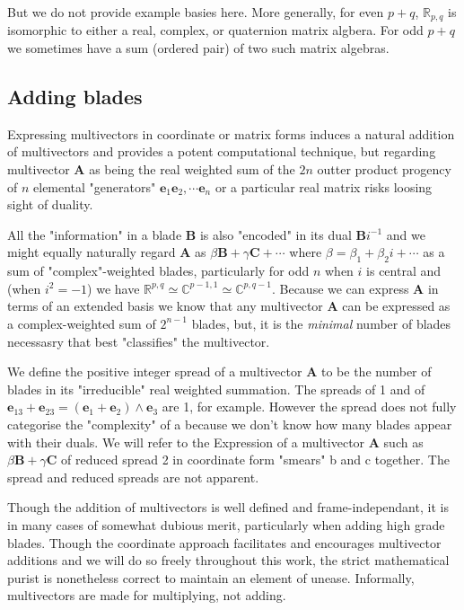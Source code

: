 \documentclass[a4paper]{book}
\numberwithin{equation}{chapter}
\begin{document}
 But we do not provide example basies here. More generally, for even $p+q$, $\mathbb{R}_{p,q}$ 
 is isomorphic to either a real, complex, or quaternion matrix algbera. For odd $p+q$ 
 we sometimes have a sum (ordered pair) of two such matrix algebras. 

    \subsection{Adding blades}

Expressing multivectors in coordinate or matrix forms induces a natural addition of multivectors and provides a 
potent computational technique, but regarding multivector $\mathbf{A}$ as being the real weighted sum of the $2n$
outter product progency of $n$ elemental "generators"  $\mathbf{e}_1\mathbf{e}_2, \cdots \mathbf{e}_n$ 
or a particular real matrix risks loosing sight of duality. 

All the "information" in a blade $\mathbf{B}$ is also "encoded" in its dual $\mathbf{B}i^{-1}$ 
and we might equally naturally 
regard $\mathbf{A}$ as $\beta \mathbf{B} + \gamma\mathbf{C} + \cdots$ where 
$\beta = \beta_1 + \beta_2i + \cdots$ as a sum of "complex"-weighted blades, particularly for odd $n$ when
$i$ is central and (when $i^2=-1$) we have $\mathbb{R}^{p,q}\simeq\mathbb{C}^{p-1,1}
\simeq \mathbb{C}^{p,q-1}$. Because we can express 
$\mathbf{A}$ in terms of an extended basis we know that any multivector $\mathbf{A}$ 
can be expressed as a complex-weighted sum of $2^{n-1}$ blades, but, it is the 
\emph{minimal} number of blades necessasry that best "classifies" the multivector. 

\vspace{\baselineskip}

We define the positive integer spread of a multivector $\mathbf{A}$ to be the number of blades in its
"irreducible" real weighted summation.   The spreads of 1 and of $\mathbf{e}_{13} + \mathbf{e}_{23}
= (\mathbf{e}_1+\mathbf{e}_2) \wedge \mathbf{e}_3 $  are 1, for example. However the spread 
does not fully categorise the "complexity" of a because we don't know how many blades appear 
with their duals. We will refer to the Expression of a multivector $\mathbf{A}$ such 
as $\beta\mathbf{B}+\gamma \mathbf{C}$  of reduced spread 2 in coordinate form "smears" b and c together. The spread and reduced spreads are not apparent.

\vspace{\baselineskip}

Though the addition of multivectors is well defined and frame-independant, it is in many cases of somewhat dubious merit, particularly when adding high grade blades. Though the coordinate approach facilitates and encourages multivector additions and we will do so freely throughout this work, the strict mathematical purist is nonetheless correct to maintain an element of unease. Informally, multivectors are made for multiplying, not adding. 
\end{document}
